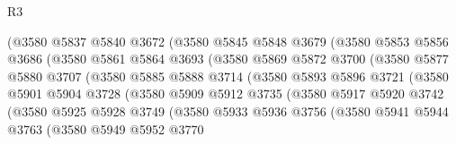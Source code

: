 \begin{lexlean}{R3}
\begin{coremodule}
                      (@3580
                        @5837
                        @5840
                        @3672
                        (@3580
                          @5845
                          @5848
                          @3679
                          (@3580
                            @5853
                            @5856
                            @3686
                            (@3580
                              @5861
                              @5864
                              @3693
                              (@3580
                                @5869
                                @5872
                                @3700
                                (@3580
                                  @5877
                                  @5880
                                  @3707
                                  (@3580
                                    @5885
                                    @5888
                                    @3714
                                    (@3580
                                      @5893
                                      @5896
                                      @3721
                                      (@3580
                                        @5901
                                        @5904
                                        @3728
                                        (@3580
                                          @5909
                                          @5912
                                          @3735
                                          (@3580
                                            @5917
                                            @5920
                                            @3742
                                            (@3580
                                              @5925
                                              @5928
                                              @3749
                                              (@3580
                                                @5933
                                                @5936
                                                @3756
                                                (@3580
                                                  @5941
                                                  @5944
                                                  @3763
                                                  (@3580
                                                    @5949
                                                    @5952
                                                    @3770

\end{coremodule}
\end{lexlean}
